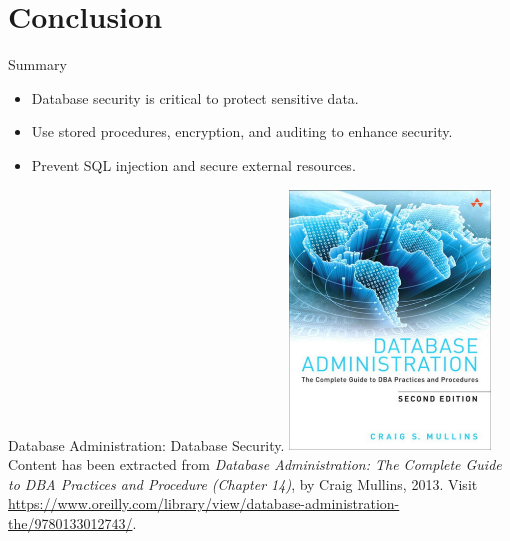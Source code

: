 \documentclass{beamer}
\begin{document}
\section{Conclusion}

\begin{frame}{Summary}
    \begin{itemize}
        \item Database security is critical to protect sensitive data.
        \item Use stored procedures, encryption, and auditing to enhance security.
        \item Prevent SQL injection and secure external resources.
    \end{itemize}
\end{frame}

\begin{frame}{Database Administration: Database Security.}
    \centering
    \includegraphics[width=0.4\textwidth]{figures/book_cover}\\
    \vspace{2mm}
    {
        \scriptsize
        Content has been extracted from \textit{Database Administration: The Complete Guide to DBA Practices and Procedure (Chapter 14)}, by Craig Mullins, 2013.  Visit \url{https://www.oreilly.com/library/view/database-administration-the/9780133012743/}.\\
    }
\end{frame}
\end{document}
